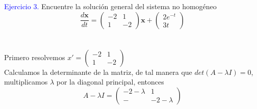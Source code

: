 \textcolor{blue}{Ejercicio 3.} Encuentre la solución general del sistema no homogéneo
$$\frac{d\textbf{x}}{dt} = \begin{pmatrix}
-2 & 1\\
1 & -2
\end{pmatrix}\textbf{x} + \begin{pmatrix}
2e^{-t}\\
3t
\end{pmatrix}$$
\\
\\
Primero resolvemos $x' = \begin{pmatrix} 
-2 & 1\\
1 & -2
\end{pmatrix}$
\\
Calculamos la determinante de la matriz, de tal manera que $det(A - \lambda I) = 0$, multiplicamos $\lambda$ por la diagonal principal, entonces
$$A - \lambda I = \begin{pmatrix}
-2- \lambda & 1\\
- & -2- \lambda
\end{pmatrix}$$

